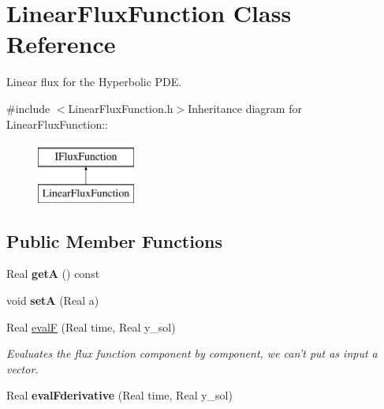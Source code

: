 \hypertarget{classLinearFluxFunction}{
\section{LinearFluxFunction Class Reference}
\label{classLinearFluxFunction}
}


Linear flux for the Hyperbolic PDE.  


{\ttfamily \#include $<$LinearFluxFunction.h$>$}Inheritance diagram for LinearFluxFunction::\begin{figure}[H]
\begin{center}
\leavevmode
\includegraphics[height=2cm]{classLinearFluxFunction}
\end{center}
\end{figure}
\subsection*{Public Member Functions}
\begin{DoxyCompactItemize}
\item 
\hypertarget{classLinearFluxFunction_a7ed546c493111d905b74f21525dba6aa}{
Real {\bfseries getA} () const }
\label{classLinearFluxFunction_a7ed546c493111d905b74f21525dba6aa}

\item 
\hypertarget{classLinearFluxFunction_a56fac54d5cff803b220ce6e07e90d8ef}{
void {\bfseries setA} (Real a)}
\label{classLinearFluxFunction_a56fac54d5cff803b220ce6e07e90d8ef}

\item 
\hypertarget{classLinearFluxFunction_a31a0643b300312e983e81cba2369ddc0}{
Real \hyperlink{classLinearFluxFunction_a31a0643b300312e983e81cba2369ddc0}{evalF} (Real time, Real y\_\-sol)}
\label{classLinearFluxFunction_a31a0643b300312e983e81cba2369ddc0}

\begin{DoxyCompactList}\small\item\em Evaluates the flux function component by component, we can't put as input a vector. \item\end{DoxyCompactList}\item 
\hypertarget{classLinearFluxFunction_a0091e8fac858703d344ca66d108f1b39}{
Real {\bfseries evalFderivative} (Real time, Real y\_\-sol)}
\label{classLinearFluxFunction_a0091e8fac858703d344ca66d108f1b39}

\end{DoxyCompactItemize}


